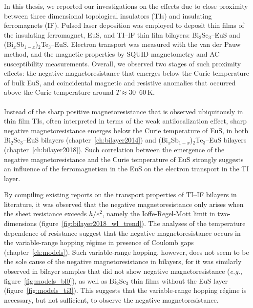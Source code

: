 In this thesis, we reported our investigations on the effects due to close proximity between three dimensional topological insulators (TIs) and insulating ferromagnets (IF). Pulsed laser deposition was employed to deposit thin films of the insulating ferromagnet, EuS, and TI--IF thin film bilayers: Bi$_2$Se$_3$--EuS and (Bi$_x$Sb$_{1-x}$)$_2$Te$_3$--EuS. Electron transport was measured with the van der Pauw method, and the magnetic properties by SQUID magnetometry and AC susceptibility measurements. Overall, we observed two stages of such proximity effects: the negative magnetoresistance that emerges below the Curie temperature of bulk EuS, and coincidental magnetic and resistive anomalies that occurred above the Curie temperature around $T\approx30$--$60~\mathrm{K}$.

\paragraph{}
Instead of the sharp positive magnetoresistance that is observed ubiquitously in thin film TIs, often interpreted in terms of the weak antilocalization effect, sharp negative magnetoresistance emerges below the Curie temperature of EuS, in both Bi$_2$Se$_3$--EuS bilayers (chapter~\ref{ch:bilayer2014}) and (Bi$_x$Sb$_{1-x}$)$_2$Te$_3$--EuS bilayers (chapter~\ref{ch:bilayer2018}). Such correlation between the emergence of the negative magnetoresistance and the Curie temperature of EuS strongly suggests an influence of the ferromagnetism in the EuS on the electron transport in the TI layer.

By compiling existing reports on the transport properties of TI--IF bilayers in literature, it was observed that the negative magnetoresistance only arises when the sheet resistance exceeds $h / e^2$, namely the Ioffe-Regel-Mott limit in two-dimensions (figure~\ref{fig:bilayer2018_wl_trend}). The analyses of the temperature dependence of resistance suggest that the negative magnetoresistance occurs in the variable-range hopping r\'egime in presence of Coulomb gaps (chapter~\ref{ch:models}). Such variable-range hopping, however, does not seem to be the sole cause of the negative magnetoresistance in bilayers, for it was similarly observed in bilayer samples that did not show negative magnetoresistance (\textit{e.g.}, figure~\ref{fig:models_bl0}), as well as Bi$_2$Se$_3$ thin films without the EuS layer (figure~\ref{fig:models_ti3}). This suggests that the variable-range hopping r\'egime is necessary, but not sufficient, to observe the negative magnetoresistance.

